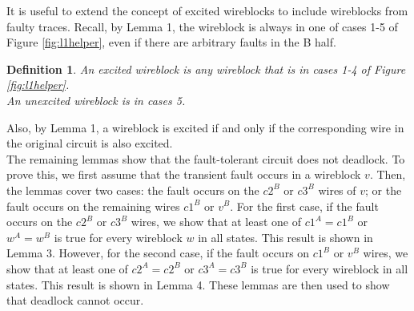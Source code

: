 \documentclass[12pt]{report}
\newtheorem*{definition}{Definition}
\begin{document}
It is useful to extend the concept of excited wireblocks to include wireblocks from faulty traces.  Recall, by Lemma 1, the wireblock is always in one of cases 1-5 of Figure \ref{fig:l1helper}, even if there are arbitrary faults in the B half.
\begin{definition}
An {\em excited wireblock} is any wireblock that is in cases 1-4 of Figure \ref{fig:l1helper}. \\ An {\em unexcited wireblock} is in cases 5. 
\end{definition}
Also, by Lemma 1, a wireblock is excited if and only if the corresponding wire in the original circuit is also excited.\\

The remaining lemmas show that the fault-tolerant circuit does not deadlock.  To prove this, we first assume that the transient fault occurs in a wireblock $v$.  Then, the lemmas cover two cases: the fault occurs on the $c2^B$ or $c3^B$ wires of $v$; or the fault occurs on the remaining wires $c1^B$ or $v^B$.  For the first case, if the fault occurs on the $c2^B$ or $c3^B$ wires, we show that at least one of $c1^A=c1^B$ or $w^A=w^B$ is true for every wireblock $w$ in all states.  This result is shown in Lemma 3.  However, for the second case, if the fault occurs on $c1^B$ or $v^B$ wires, we show that at least one of $c2^A=c2^B$ or $c3^A=c3^B$ is true for every wireblock in all states.  This result is shown in Lemma 4.  These lemmas are then used to show that deadlock cannot occur.\\
\end{document}

